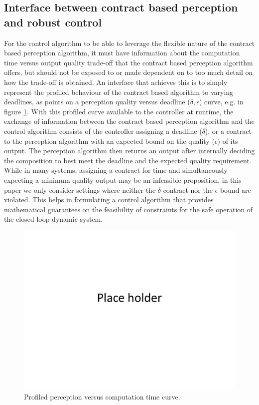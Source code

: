 \subsection{Interface between contract based perception and robust control}

For the control algorithm to be able to leverage the flexible nature of the contract based perception algorithm, it must have information about the computation time versus output quality trade-off that the contract based perception algorithm offers, but should not be exposed to or made dependent on to too much detail on how the trade-off is obtained. An interface that achieves this is to simply represent the profiled behaviour of the contract based algorithm to varying deadlines, as points on a perception quality versus deadline ($\delta, \epsilon$) curve, e.g. in figure \ref{fig:eps_delta_toy}.
With this profiled curve available to the controller at runtime, the exchange of information between the contract based perception algorithm and the control algorithm consists of the controller assigning a deadline ($\delta$), or a contract to the perception algorithm with an expected bound on the quality ($\epsilon$) of its output. The perception algorithm then returns an output after internally deciding the composition to best meet the deadline and the expected quality requirement. While in many systems, assigning a contract for time and simultaneously expecting a minimum quality output may be an infeasible proposition, in this paper we only consider settings where neither the $\delta$ contract nor the $\epsilon$ bound are violated. This helps in formulating a control algorithm that provides mathematical guarantees on the feasibility of constraints for the safe operation of the closed loop dynamic system.

\begin{figure}[t]
	\centering
	\includegraphics[width=0.9\columnwidth]{figures/placeHolder}
	\caption{Profiled perception versus computation time curve.}
	\label{fig:eps_delta_toy}
\end{figure}

